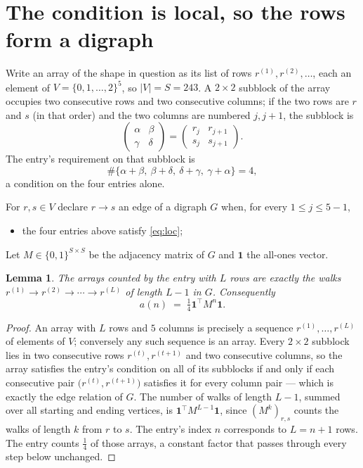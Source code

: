 \documentclass[11pt,a4paper]{article}
\theoremstyle{plain}
\newtheorem{lemma}[theorem]{Lemma}
\theoremstyle{definition}
\begin{document}
\section{The condition is local, so the rows form a digraph}

Write an array of the shape in question as its list of rows
$r^{(1)},r^{(2)},\dots$, each an element of
$V=\{0,1,\dots,2\}^{5}$, so $|V|=S=243$. A $2\times2$ subblock of the array
occupies two consecutive rows and two consecutive columns; if the two rows are $r$
and $s$ (in that order) and the two columns are numbered $j,j+1$,
the subblock is
\[
\begin{pmatrix}\alpha&\beta\\\gamma&\delta\end{pmatrix}=\begin{pmatrix}r_j&r_{j+1}\\s_j&s_{j+1}\end{pmatrix}.
\]
The entry's requirement on that subblock is
\begin{equation}\label{eq:loc}
\#\{\alpha+\beta,\ \beta+\delta,\ \delta+\gamma,\ \gamma+\alpha\}=4,
\end{equation}
a condition on the four entries alone.

For $r,s\in V$ declare $r\to s$ an edge of a digraph $G$ when, for every
$1\le j\le 5-1$,
\begin{itemize}
\item the four entries above satisfy \eqref{eq:loc};

\end{itemize}
Let $M\in\{0,1\}^{S\times S}$ be the adjacency matrix of $G$ and $\mathbf{1}$ the
all-ones vector.

\begin{lemma}\label{lem:walk}
The arrays counted by the entry with $L$ rows are exactly the walks
$r^{(1)}\to r^{(2)}\to\cdots\to r^{(L)}$ of length $L-1$ in $G$. Consequently
\[
a(n)\;=\;\tfrac1{4}\mathbf{1}^{\!\top}M^{n}\mathbf{1} .
\]
\end{lemma}

\begin{proof}
An array with $L$ rows and $5$ columns is precisely a sequence
$r^{(1)},\dots,r^{(L)}$ of elements of $V$; conversely any such sequence is an array.
Every $2\times2$ subblock lies in two consecutive rows $r^{(t)},r^{(t+1)}$ and two
consecutive columns, so the array satisfies the entry's condition on all of its subblocks
if and only if each consecutive pair $\bigl(r^{(t)},r^{(t+1)}\bigr)$ satisfies it for
every column pair --- which is exactly the edge relation of $G$. The number of walks of
length $L-1$, summed over all starting and ending vertices, is
$\mathbf{1}^{\!\top}M^{L-1}\mathbf{1}$, since $(M^{k})_{r,s}$ counts the walks of
length $k$ from $r$ to $s$. The entry's index $n$ corresponds to $L=n+1$ rows. The entry counts $\tfrac1{4}$ of those arrays, a constant factor that passes through every step below unchanged.
\end{proof}
\end{document}
